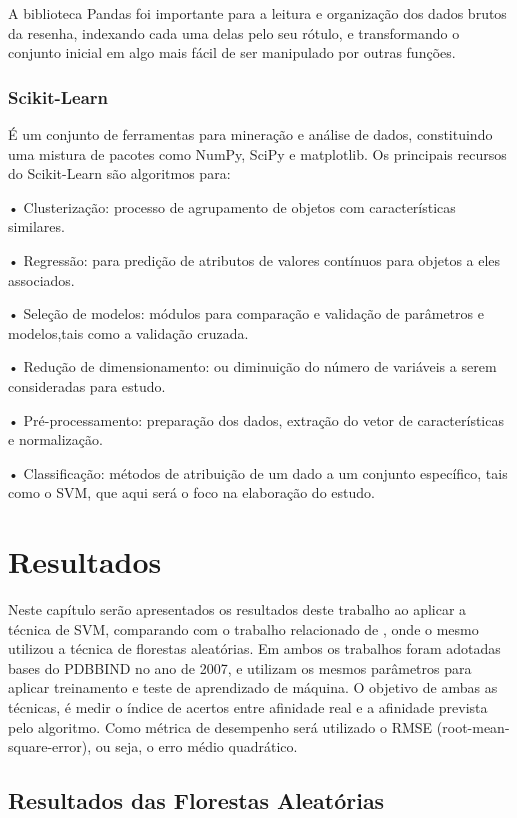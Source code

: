 \documentclass[tcc, capa]{texucpel}
\begin{document}
A biblioteca Pandas foi importante para a leitura e organização dos dados brutos da resenha, indexando cada uma delas pelo seu rótulo, e transformando o conjunto inicial em algo mais fácil de ser manipulado por outras funções.

\subsection{Scikit-Learn}
É um conjunto de ferramentas para mineração e análise de dados, constituindo uma mistura de pacotes como NumPy, SciPy e matplotlib. Os principais recursos do Scikit-Learn são algoritmos para:

• Clusterização: processo de agrupamento de objetos com características similares.

• Regressão: para predição de atributos de valores contínuos para objetos a eles associados.

• Seleção de modelos: módulos para comparação e validação de parâmetros e modelos,tais como a validação cruzada.

• Redução de dimensionamento: ou diminuição do número de variáveis a serem consideradas para estudo.

• Pré-processamento: preparação dos dados, extração do vetor de características e  normalização.

• Classificação: métodos de atribuição de um dado a um conjunto específico, tais como o SVM, que aqui será o foco na elaboração do estudo.



\chapter{Resultados}
Neste capítulo serão apresentados os resultados deste trabalho ao aplicar a técnica de SVM, comparando com o trabalho relacionado de \citeauthor{ballester2010machine}, onde o mesmo utilizou a técnica de florestas aleatórias. 
Em ambos os trabalhos foram adotadas bases do PDBBIND no ano de 2007, e utilizam os mesmos parâmetros para aplicar treinamento e teste de aprendizado de máquina.
O objetivo de ambas as técnicas, é medir o índice de acertos entre afinidade real e a afinidade prevista pelo algoritmo.
Como métrica de desempenho será utilizado o RMSE (root-mean-square-error), ou seja, o erro médio quadrático.

\section{Resultados das Florestas Aleatórias}
\end{document}
